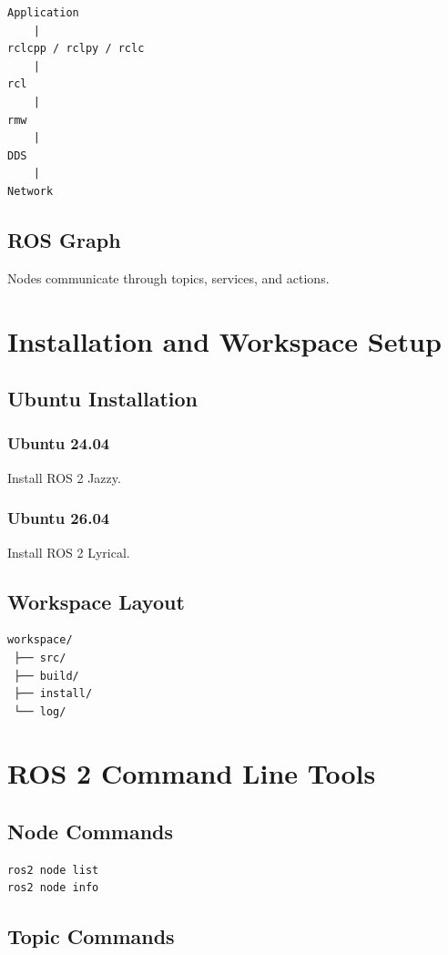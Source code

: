 \documentclass[11pt,oneside]{book}
\begin{document}
\begin{verbatim}
Application
    |
rclcpp / rclpy / rclc
    |
rcl
    |
rmw
    |
DDS
    |
Network
\end{verbatim}

\section{ROS Graph}
Nodes communicate through topics, services, and actions.

\chapter{Installation and Workspace Setup}

\section{Ubuntu Installation}
\subsection{Ubuntu 24.04}
Install ROS 2 Jazzy.

\subsection{Ubuntu 26.04}
Install ROS 2 Lyrical.

\section{Workspace Layout}

\begin{verbatim}
workspace/
 ├── src/
 ├── build/
 ├── install/
 └── log/
\end{verbatim}

\chapter{ROS 2 Command Line Tools}

\section{Node Commands}

\begin{verbatim}
ros2 node list
ros2 node info
\end{verbatim}

\section{Topic Commands}
\end{document}

